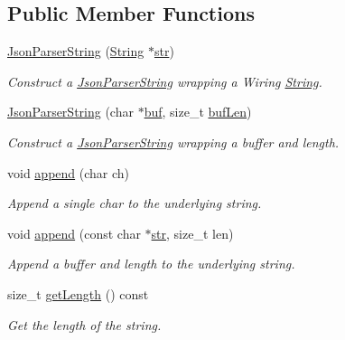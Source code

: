 \subsection*{Public Member Functions}
\begin{DoxyCompactItemize}
\item 
\hyperlink{class_json_parser_string_a3942a87b6920b08e38ce01b4d4a41fc4}{Json\+Parser\+String} (\hyperlink{class_string}{String} $\ast$\hyperlink{class_json_parser_string_ac98659ff5a56537979b6c60d28648224}{str})
\begin{DoxyCompactList}\small\item\em Construct a \hyperlink{class_json_parser_string}{Json\+Parser\+String} wrapping a Wiring \hyperlink{class_string}{String}. \end{DoxyCompactList}\item 
\hyperlink{class_json_parser_string_ae0f9e3309682685ed259ad1370eb448f}{Json\+Parser\+String} (char $\ast$\hyperlink{class_json_parser_string_a3ffd87df1aff38ff4142fad32e1e3de0}{buf}, size\+\_\+t \hyperlink{class_json_parser_string_a376957bb37fc229f44d0d85ce74adb4a}{buf\+Len})
\begin{DoxyCompactList}\small\item\em Construct a \hyperlink{class_json_parser_string}{Json\+Parser\+String} wrapping a buffer and length. \end{DoxyCompactList}\item 
void \hyperlink{class_json_parser_string_a7a8f809096c291c4cd7717df4a6534cf}{append} (char ch)
\begin{DoxyCompactList}\small\item\em Append a single char to the underlying string. \end{DoxyCompactList}\item 
void \hyperlink{class_json_parser_string_a28e2858fe1481e20fa8bc40054378c9f}{append} (const char $\ast$\hyperlink{class_json_parser_string_ac98659ff5a56537979b6c60d28648224}{str}, size\+\_\+t len)
\begin{DoxyCompactList}\small\item\em Append a buffer and length to the underlying string. \end{DoxyCompactList}\item 
size\+\_\+t \hyperlink{class_json_parser_string_a3a495e1fb69d2900fda8b0556c93e51c}{get\+Length} () const
\begin{DoxyCompactList}\small\item\em Get the length of the string. \end{DoxyCompactList}\end{DoxyCompactItemize}
